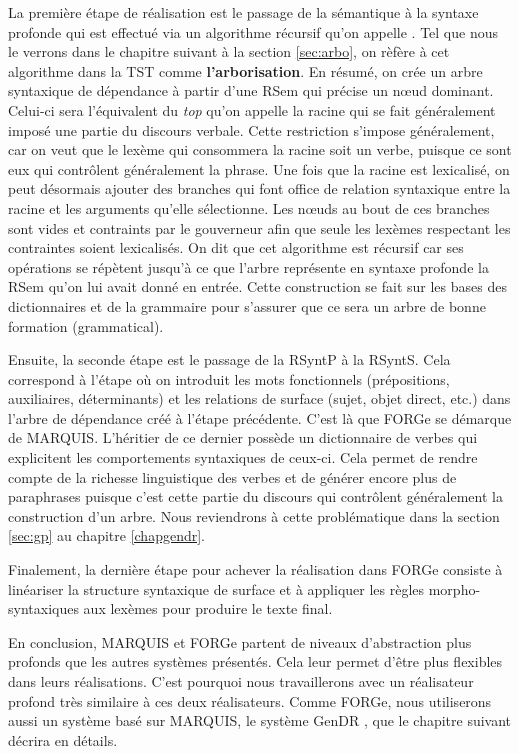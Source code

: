 La première étape de réalisation est le passage de la sémantique à la syntaxe profonde qui est effectué via un algorithme récursif qu'on appelle . Tel que nous le verrons dans le chapitre suivant à la section \ref{sec:arbo}, on rèfère à cet algorithme dans la \ac{TST} comme \textbf{l'arborisation}. En résumé, on crée un arbre syntaxique de dépendance à partir d'une \ac{RSem} qui précise un n\oe{}ud dominant. Celui-ci sera l'équivalent du \emph{top} qu'on appelle la racine qui se fait généralement imposé une partie du discours verbale. Cette restriction s'impose généralement, car on veut que le lexème qui consommera la racine soit un verbe, puisque ce sont eux qui contrôlent généralement la phrase. Une fois que la racine est lexicalisé, on peut désormais ajouter des branches qui font office de relation syntaxique entre la racine et les arguments qu'elle sélectionne. Les n\oe{}uds au bout de ces branches sont vides et contraints par le gouverneur afin que seule les lexèmes respectant les contraintes soient lexicalisés. On dit que cet algorithme est récursif car ses opérations se répètent jusqu'à ce que l'arbre représente en syntaxe profonde la \ac{RSem} qu'on lui avait donné en entrée. Cette construction se fait sur les bases des dictionnaires et de la grammaire pour s'assurer que ce sera un arbre de bonne formation (grammatical).

Ensuite, la seconde étape est le passage de la \ac{RSyntP} à la \ac{RSyntS}. Cela correspond à l'étape où on introduit les mots fonctionnels (prépositions, auxiliaires, déterminants) et les relations de surface (sujet, objet direct, etc.) dans l'arbre de dépendance créé à l'étape précédente. C'est là que FORGe se démarque de MARQUIS. L'héritier de ce dernier possède un dictionnaire de verbes qui explicitent les comportements syntaxiques de ceux-ci. Cela permet de rendre compte de la richesse linguistique des verbes et de générer encore plus de paraphrases puisque c'est cette partie du discours qui contrôlent généralement la construction d'un arbre. Nous reviendrons à cette problématique dans la section \ref{sec:gp} au chapitre \ref{chapgendr}.
                                                                                                                     
Finalement, la dernière étape pour achever la réalisation dans FORGe consiste à linéariser la structure syntaxique de surface et à appliquer les règles morpho-syntaxiques aux lexèmes pour produire le texte final.

En conclusion, MARQUIS et FORGe partent de niveaux d'abstraction plus profonds que les autres systèmes présentés. Cela leur permet d'être plus flexibles dans leurs réalisations. C'est pourquoi nous travaillerons avec un réalisateur profond très similaire à ces deux réalisateurs. Comme FORGe, nous utiliserons aussi un système basé sur MARQUIS, le système GenDR \citep{lambrey15,LambreyImplementationcollocationspour2017,lareau18}, que le chapitre suivant décrira en détails.
